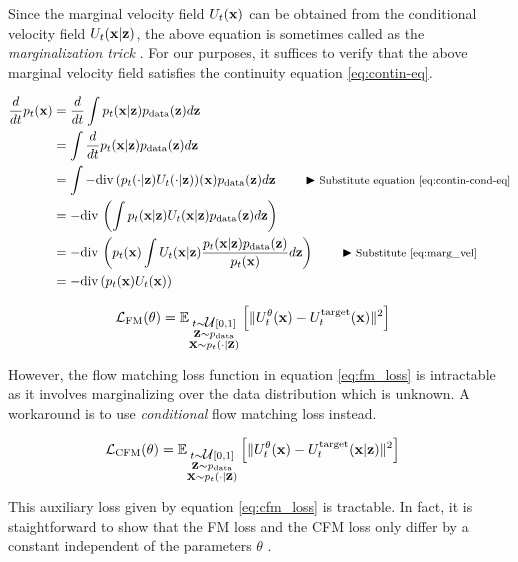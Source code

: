 \documentclass[a4paper, 11pt]{article}
\begin{document}
Since the marginal velocity field $U_t(\vx)$ can be obtained from the conditional velocity field $U_t(\vx | \vz)$, the above equation is sometimes called as the \textit{marginalization trick} \citep{flowsanddiffusions2025}. For our purposes, it suffices to verify that the above marginal velocity field satisfies the continuity equation \eqref{eq:contin-eq}.

\begin{align}
    \frac{d}{dt} p_t(\vx) &= \frac{d}{dt} \int p_t(\vx | \vz) p_{\text{data}}(\vz) d\vz \\
    &= \int \frac{d}{dt} p_t(\vx | \vz) p_{\text{data}}(\vz) d\vz \\
    &= \int - \diver (p_t(\cdot |\vz) U_t(\cdot |\vz))(\vx)  p_{\text{data}}(\vz) d\vz \eqcomment{Substitute equation \eqref{eq:contin-cond-eq}}\\
    &= - \diver \left ( \int p_t(\vx |\vz)U_t(\vx |\vz)  p_{\text{data}}(\vz) d\vz \right ) \\
    &= - \diver \left ( p_t(\vx) \int U_t(\vx |\vz) \frac{p_t(\vx |\vz)  p_{\text{data}}(\vz)}{p_t(\vx)} d\vz \right ) \eqcomment{Substitute \eqref{eq:marg_vel}}\\
    &= - \diver( p_t(\vx)U_t(\vx))
\end{align}



\begin{align}
    \fL_{\text{FM}}(\theta) &= \E_{\substack{t \sim \fU[0, 1] \\ 
    \vz \sim p_{\text{data}} \\
    \vx \sim p_t(\cdot | \vz)}} \left [ \|U_t^{\theta}(\vx) - U_t^{\text{target}}(\vx) \|^2 \right ] \label{eq:fm_loss}
\end{align}

However, the flow matching loss function in equation \eqref{eq:fm_loss} is intractable as it involves marginalizing over the data distribution which is unknown. A workaround is to use \textit{conditional} flow matching loss instead.

\begin{align}
    \fL_{\text{CFM}}(\theta) &= \E_{\substack{t \sim \fU[0, 1] \\ 
    \vz \sim p_{\text{data}} \\
    \vx \sim p_t(\cdot | \vz)}} \left [ \|U_t^{\theta}(\vx) - U_t^{\text{target}}(\vx | \vz) \|^2 \right ]\label{eq:cfm_loss}
\end{align}

This auxiliary loss given by equation \eqref{eq:cfm_loss} is tractable. In fact, it is staightforward to show that  the FM loss and the CFM loss only differ by a constant independent of the parameters $\theta$ \citep{holderrieth2025generatormatchinggenerativemodeling}.
\end{document}
